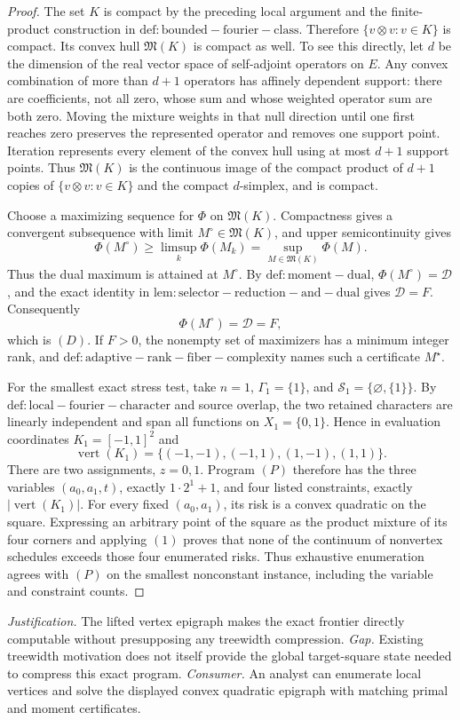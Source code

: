 \documentclass{article}
\begin{document}
\begin{proof}
The set \(K\) is compact by the preceding local argument and the finite-product construction in \(\mathrm{def:bounded-fourier-class}\). Therefore \(\{v\otimes v:v\in K\}\) is compact. Its convex hull \(\mathfrak M(K)\) is compact as well. To see this directly, let \(d\) be the dimension of the real vector space of self-adjoint operators on \(E\). Any convex combination of more than \(d+1\) operators has affinely dependent support: there are coefficients, not all zero, whose sum and whose weighted operator sum are both zero. Moving the mixture weights in that null direction until one first reaches zero preserves the represented operator and removes one support point. Iteration represents every element of the convex hull using at most \(d+1\) support points. Thus \(\mathfrak M(K)\) is the continuous image of the compact product of \(d+1\) copies of \(\{v\otimes v:v\in K\}\) and the compact \(d\)-simplex, and is compact.

Choose a maximizing sequence for \(\Phi\) on \(\mathfrak M(K)\). Compactness gives a convergent subsequence with limit \(M^{\circ}\in\mathfrak M(K)\), and upper semicontinuity gives
\[
\Phi(M^{\circ})\ge\limsup_k\Phi(M_k)
=\sup_{M\in\mathfrak M(K)}\Phi(M).
\]
Thus the dual maximum is attained at \(M^{\circ}\). By \(\mathrm{def:moment-dual}\), \(\Phi(M^{\circ})=\mathcal D\), and the exact identity in \(\mathrm{lem:selector-reduction-and-dual}\) gives \(\mathcal D=F\). Consequently
\[
\Phi(M^{\circ})=\mathcal D=F,
\]
which is \((D)\). If \(F>0\), the nonempty set of maximizers has a minimum integer rank, and \(\mathrm{def:adaptive-rank-fiber-complexity}\) names such a certificate \(M^{\star}\).

For the smallest exact stress test, take \(n=1\), \(\Gamma_1=\{1\}\), and \(\mathcal S_1=\{\varnothing,\{1\}\}\). By \(\mathrm{def:local-fourier-character}\) and source overlap, the two retained characters are linearly independent and span all functions on \(X_1=\{0,1\}\). Hence in evaluation coordinates \(K_1=[-1,1]^2\) and
\[
\operatorname{vert}(K_1)=\{(-1,-1),(-1,1),(1,-1),(1,1)\}.
\]
There are two assignments, \(z=0,1\). Program \((P)\) therefore has the three variables \((a_0,a_1,t)\), exactly \(1\cdot2^1+1\), and four listed constraints, exactly \(\lvert\operatorname{vert}(K_1)\rvert\). For every fixed \((a_0,a_1)\), its risk is a convex quadratic on the square. Expressing an arbitrary point of the square as the product mixture of its four corners and applying \((1)\) proves that none of the continuum of nonvertex schedules exceeds those four enumerated risks. Thus exhaustive enumeration agrees with \((P)\) on the smallest nonconstant instance, including the variable and constraint counts.
\end{proof}
\par\smallskip\noindent \textit{Justification.} The lifted vertex epigraph makes the exact frontier directly computable without presupposing any treewidth compression. \textit{Gap.} Existing treewidth motivation does not itself provide the global target-square state needed to compress this exact program. \textit{Consumer.} An analyst can enumerate local vertices and solve the displayed convex quadratic epigraph with matching primal and moment certificates.
\end{document}
